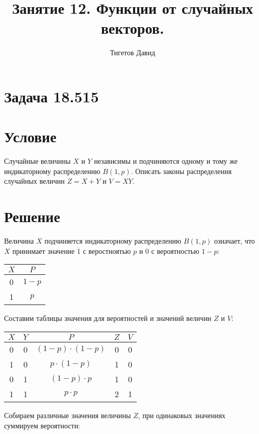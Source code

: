 \documentclass[a4paper,12pt]{article}
\begin{document}
    \title{Занятие 12. Функции от случайных векторов.}
    \author{Тигетов Давид}
    \maketitle


    \section{Задача 18.515}
    \section*{Условие}
    Случайные величины $X$ и $Y$ независимы и подчиняются одному и тому же индикаторному распределению $B(1,p)$. Описать законы распределения случайных величин
    $Z = X + Y$ и $V = X Y$.
    \section*{Решение}
    Величина $X$ подчиняется индикаторному распределению $B(1,p)$ означает, что $X$ принимает значение 1 с веростноятью $p$ и 0 с вероятностью $1-p$:

    \begin{tabular}{|c|c|}
        \hline
        $X$ & $P$   \\
        \hline
        0   & $1-p$ \\
        \hline
        1   & $p$   \\
        \hline
    \end{tabular}

    Составим таблицы значения для вероятностей и значений величин $Z$ и $V$:

    \begin{tabular}{|c|c|c|c|c|}
        \hline
        $X$ & $Y$ & $P$                 & $Z$ & $V$ \\
        \hline
        0   & 0   & $(1-p) \cdot (1-p)$ & 0   & 0   \\
        \hline
        1   & 0   & $p \cdot (1-p)$     & 1   & 0   \\
        \hline
        0   & 1   & $(1-p) \cdot p$     & 1   & 0   \\
        \hline
        1   & 1   & $p \cdot p$         & 2   & 1   \\
        \hline
    \end{tabular}

    Собираем различные значения величины $Z$, при одинаковых значениях суммируем вероятности:
\end{document}
